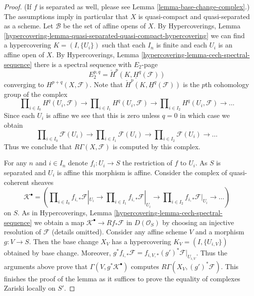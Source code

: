 \begin{proof}
(If $f$ is separated as well, please see
Lemma \ref{lemma-base-change-complex}.)
The assumptions imply in particular that $X$
is quasi-compact and quasi-separated as a scheme.
Let $\mathcal{B}$ be the set of affine opens of $X$. By
Hypercoverings,
Lemma \ref{hypercovering-lemma-quasi-separated-quasi-compact-hypercovering}
we can find a hypercovering $K = (I, \{U_i\})$ such that each
$I_n$ is finite and each $U_i$ is an affine open of $X$. By
Hypercoverings, Lemma \ref{hypercovering-lemma-cech-spectral-sequence}
there is a spectral sequence with $E_2$-page
$$
E_2^{p, q} = \check{H}^p(K, \underline{H}^q(\mathcal{F}))
$$
converging to $H^{p + q}(X, \mathcal{F})$. Note that
$\check{H}^p(K, \underline{H}^q(\mathcal{F}))$ is the $p$th cohomology
group of the complex
$$
\prod\nolimits_{i \in I_0} H^q(U_i, \mathcal{F})
\to
\prod\nolimits_{i \in I_1} H^q(U_i, \mathcal{F})
\to
\prod\nolimits_{i \in I_2} H^q(U_i, \mathcal{F})
\to \ldots
$$
Since each $U_i$ is affine we see that this is zero unless $q = 0$
in which case we obtain
$$
\prod\nolimits_{i \in I_0} \mathcal{F}(U_i)
\to
\prod\nolimits_{i \in I_1} \mathcal{F}(U_i)
\to
\prod\nolimits_{i \in I_2} \mathcal{F}(U_i)
\to \ldots
$$
Thus we conclude that $R\Gamma(X, \mathcal{F})$ is computed by
this complex.

\medskip\noindent
For any $n$ and $i \in I_n$ denote $f_i : U_i \to S$ the restriction of
$f$ to $U_i$. As $S$ is separated and $U_i$ is affine this morphism
is affine. Consider the complex of quasi-coherent sheaves
$$
\mathcal{K}^\bullet = (
\prod\nolimits_{i \in I_0} f_{i, *}\mathcal{F}|_{U_i}
\to
\prod\nolimits_{i \in I_1} f_{i, *}\mathcal{F}|_{U_i}
\to
\prod\nolimits_{i \in I_2} f_{i, *}\mathcal{F}|_{U_i}
\to \ldots )
$$
on $S$. As in
Hypercoverings, Lemma \ref{hypercovering-lemma-cech-spectral-sequence}
we obtain a map $\mathcal{K}^\bullet \to Rf_*\mathcal{F}$ in
$D(\mathcal{O}_S)$ by choosing an injective resolution of $\mathcal{F}$
(details omitted). Consider any affine scheme $V$ and a morphism
$g : V \to S$. Then the base change $X_V$ has a hypercovering
$K_V = (I, \{U_{i, V}\})$ obtained by base change. Moreover,
$g^*f_{i, *}\mathcal{F} = f_{i, V, *}(g')^*\mathcal{F}|_{U_{i, V}}$.
Thus the arguments above prove that $\Gamma(V, g^*\mathcal{K}^\bullet)$
computes $R\Gamma(X_V, (g')^*\mathcal{F})$.
This finishes the proof of the lemma as it suffices to prove
the equality of complexes Zariski locally on $S'$.
\end{proof}






